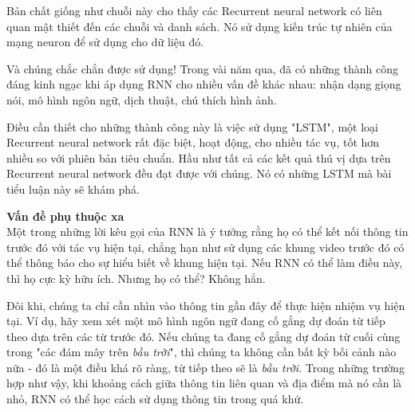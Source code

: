 Bản chất giống như chuỗi này cho thấy các Recurrent neural network có liên quan mật thiết đến các chuỗi và danh sách.
Nó sử dụng kiến trúc tự nhiên của mạng neuron để sử dụng cho dữ liệu đó.

Và chúng chắc chắn được sử dụng!
Trong vài năm qua, đã có những thành công đáng kinh ngạc khi áp dụng RNN cho nhiều vấn đề khác nhau: nhận dạng giọng
nói, mô hình ngôn ngữ, dịch thuật, chú thích hình ảnh.

Điều cần thiết cho những thành công này là việc sử dụng "LSTM", một loại Recurrent neural network rất đặc biệt, hoạt
động, cho nhiều tác vụ, tốt hơn nhiều so với phiên bản tiêu chuẩn. Hầu như tất cả các kết quả thú vị dựa trên Recurrent neural network đều đạt được với chúng. Nó có những LSTM mà bài tiểu luận này sẽ khám phá.

\textbf{Vấn đề phụ thuộc xa} \\[0.2em]
Một trong những lời kêu gọi của RNN là ý tưởng rằng họ có thể kết nối thông tin trước đó với tác vụ hiện tại, chẳng
hạn như sử dụng các khung video trước đó có thể thông báo cho sự hiểu biết về khung hiện tại. Nếu RNN có thể làm điều
này, thì họ cực kỳ hữu ích. Nhưng họ có thể? Không hẳn.

Đôi khi, chúng ta chỉ cần nhìn vào thông tin gần đây để thực hiện nhiệm vụ hiện tại. Ví dụ, hãy xem xét một mô hình
ngôn ngữ đang cố gắng dự đoán từ tiếp theo dựa trên các từ trước đó. Nếu chúng ta đang cố gắng dự đoán từ cuối cùng
trong "các đám mây trên \textit{bầu trời}", thì chúng ta không cần bất kỳ bối cảnh nào nữa - đó là một điều khá rõ ràng,
từ tiếp theo sẽ là  \textit{bầu trời}. Trong những trường hợp như vậy, khi khoảng cách giữa thông tin liên quan và
địa điểm mà nó cần là nhỏ, RNN có thể học cách sử dụng thông tin trong quá khứ.

\begin{figure}[H]
\end{figure}

